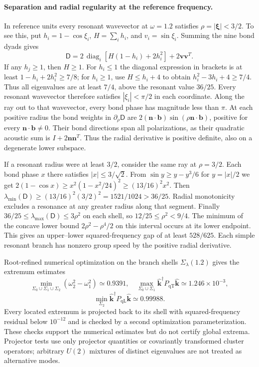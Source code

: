 \documentclass[10pt,aps,onecolumn,notitlepage,nofootinbib]{revtex4-2}
\newcommand{\vk}{\bm k}
\newcommand{\qT}{\mathrm{qT}}
\newcommand{\qL}{\mathrm{qL}}
\begin{document}
\paragraph*{Separation and radial regularity at the reference frequency.}
In reference units every resonant wavevector at $\omega=1.2$ satisfies
$\rho=|\bm\xi|<3/2$. To see this, put $h_i=1-\cos\xi_i$,
$H=\sum_i h_i$, and $v_i=\sin\xi_i$. Summing the nine bond dyads gives
\[
 \mathsf D=2\,\operatorname{diag}_{i}\!\left[H(1-h_i)+2h_i^2\right]
       +2\bm v\bm v^{T}.
\]
If any $h_j\ge1$, then $H\ge1$. For $h_i\le1$ the diagonal expression
in brackets is at least $1-h_i+2h_i^2\ge7/8$; for $h_i\ge1$, use
$H\le h_i+4$ to obtain $h_i^2-3h_i+4\ge7/4$. Thus all eigenvalues
are at least $7/4$, above the resonant value $36/25$. Every resonant
wavevector therefore satisfies $|\xi_i|<\pi/2$ in each coordinate.
Along the ray out to that wavevector, every bond phase has magnitude
less than $\pi$. At each positive radius the bond weights in
$\partial_\rho\mathsf D$ are
$2(\bm n\cdot\bm b)\sin(\rho\bm n\cdot\bm b)$, positive for every
$\bm n\cdot\bm b\ne0$. Their bond directions span all polarizations,
as their quadratic acoustic sum is $I+2\bm n\bm n^T$. Thus the radial
derivative is positive definite, also on a degenerate lower subspace.

If a resonant radius were at least $3/2$, consider the same ray at
$\rho=3/2$. Each bond phase $x$ there satisfies $|x|\le3/\sqrt2$.
From $\sin y\ge y-y^3/6$ for $y=|x|/2$ we get
$2(1-\cos x)\ge x^2(1-x^2/24)^2\ge(13/16)^2x^2$.
Then $\lambda_{\min}(\mathsf D)\ge(13/16)^2(3/2)^2=1521/1024>36/25$.
Radial monotonicity excludes a resonance at any greater radius along
that segment. Finally $36/25\le\lambda_{\max}(\mathsf D)\le3\rho^2$
on each shell, so $12/25\le\rho^2<9/4$. The minimum of the concave lower bound $2\rho^2-\rho^4/2$ on this interval occurs at its lower endpoint. This gives an upper--lower squared-frequency gap of at least
$528/625$. Each simple resonant branch has nonzero group speed by the
positive radial derivative.

Root-refined numerical optimization on the branch shells $\Sigma_\lambda(1.2)$ gives the extremum estimates
\begin{equation}
 \min_{\Sigma_0\cup\Sigma_1\cup\Sigma_2}(\omega_2^2-\omega_1^2)\simeq0.9391,
 \quad
 \max_{\Sigma_0\cup\Sigma_1}\hat{\vk}^{\dagger}P_{\qT}\hat{\vk}\simeq1.246\times10^{-3},
\end{equation}
\begin{equation}
 \min_{\Sigma_2}\hat{\vk}^{\dagger}P_{\qL}\hat{\vk}\simeq0.99988.
\end{equation}
Every located extremum is projected back to its shell with squared-frequency residual below $10^{-12}$ and is checked by a second optimization parameterization. These checks support the numerical estimates but do not certify global extrema. Projector tests use only projector quantities or covariantly transformed cluster operators; arbitrary $U(2)$ mixtures of distinct eigenvalues are not treated as alternative modes.
\end{document}
